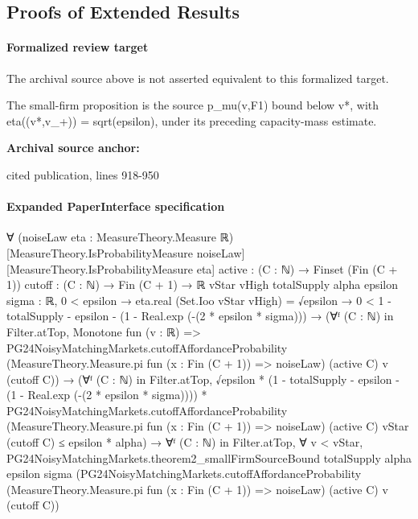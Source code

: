 \documentclass[10pt]{article}
\begin{document}
\begin{ReviewVerbatim}
\section{Proofs of Extended Results}\label{sec:proofs-extended}
\end{ReviewVerbatim}


\paragraph{Formalized review target}
The archival source above is not asserted equivalent to this formalized target.
\begin{ReviewVerbatim}
The small-firm proposition is the source p_mu(v,F1) bound below v*, with eta((v*,v_+)) = sqrt(epsilon), under its preceding capacity-mass estimate.
\end{ReviewVerbatim}

\textbf{Archival source anchor:} {\footnotesize\raggedright cited publication, lines 918-\allowbreak{}950\par}
\paragraph{Expanded PaperInterface specification}
\begin{ReviewVerbatim}
∀ (noiseLaw eta : MeasureTheory.Measure ℝ) [MeasureTheory.IsProbabilityMeasure noiseLaw]
  [MeasureTheory.IsProbabilityMeasure eta] {active : (C : ℕ) → Finset (Fin (C + 1))}
  {cutoff : (C : ℕ) → Fin (C + 1) → ℝ} {vStar vHigh totalSupply alpha epsilon sigma : ℝ},
  0 < epsilon →
    eta.real (Set.Ioo vStar vHigh) = √epsilon →
      0 < 1 - totalSupply - epsilon - (1 - Real.exp (-(2 * epsilon * sigma))) →
        (∀ᶠ (C : ℕ) in Filter.atTop,
            Monotone fun (v : ℝ) =>
              PG24NoisyMatchingMarkets.cutoffAffordanceProbability
                (MeasureTheory.Measure.pi fun (x : Fin (C + 1)) => noiseLaw) (active C) v (cutoff C)) →
          (∀ᶠ (C : ℕ) in Filter.atTop,
              √epsilon * (1 - totalSupply - epsilon - (1 - Real.exp (-(2 * epsilon * sigma)))) *
                  PG24NoisyMatchingMarkets.cutoffAffordanceProbability
                    (MeasureTheory.Measure.pi fun (x : Fin (C + 1)) => noiseLaw) (active C) vStar (cutoff C) ≤
                epsilon * alpha) →
            ∀ᶠ (C : ℕ) in Filter.atTop,
              ∀ v < vStar,
                PG24NoisyMatchingMarkets.theorem2_smallFirmSourceBound totalSupply alpha epsilon sigma
                  (PG24NoisyMatchingMarkets.cutoffAffordanceProbability
                    (MeasureTheory.Measure.pi fun (x : Fin (C + 1)) => noiseLaw) (active C) v (cutoff C))
\end{ReviewVerbatim}
\end{document}
